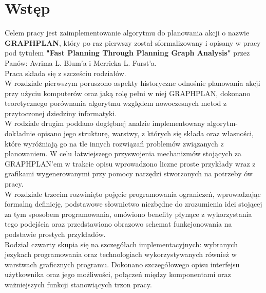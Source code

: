 \chapter*{Wstęp}

\thispagestyle{chapterBeginStyle}

Celem pracy jest zaimplementowanie algorytmu do planowania akcji o nazwie \textbf{GRAPHPLAN}, który po raz pierwszy został sformalizowany i opisany w pracy pod tytułem
\textbf{"Fast Planning Through Planning Graph Analysis"}\cite{GRAPHPLAN} przez Panów: Avrima L. Blum'a i Merricka L. Furst'a.
\\
Praca składa się z szcześciu rodziałów.
\\

	W rozdziale pierwszym poruszono aspekty historyczne odnośnie planowania akcji przy użyciu komputerów oraz jaką rolę pełni w niej GRAPHPLAN,
dokonano teoretycznego porównania algorytmu względem nowoczesnych metod z przytoczonej dziedziny informatyki.
\\

	W rodziale drugim poddano dogłębnej analzie implementowany algorytm- dokładnie opisano jego strukturę, warstwy, z których się składa oraz własności,
które wyróżniają go na tle innych rozwiązań problemów związanych z planowaniem. W celu łatwiejszego przyswojenia mechanizmów stojących
za GRAPHPLAN'em w trakcie opisu wprowadzono liczne proste przykłady wraz z grafikami wygenerowanymi przy pomocy narzędzi stworzonych
na potrzeby ów pracy.
\\

	W rozdziale trzecim rozwinięto pojęcie programowania ograniczeń, wprowadzając formalną definicję, podstawowe słownictwo niezbędne do 
	zrozumienia idei stojącej za tym sposobem programowania, omówiono benefity płynące z wykorzystania tego podejścia oraz przedstawiono
	obrazowo schemat funkcjonowania na podstawie prostych przykładów.
\\

	Rodział czwarty skupia się na szczegółach implementacyjnych: wybranych jezykach programowania oraz technologiach wykorzystywanych również
w warstwach graficznych programu. Dokonano szczegółowego opisu interfejsu użytkownika oraz jego możliwości, połączeń między komponentami oraz 
ważniejszych funkcji stanowiących trzon pracy.
\\

